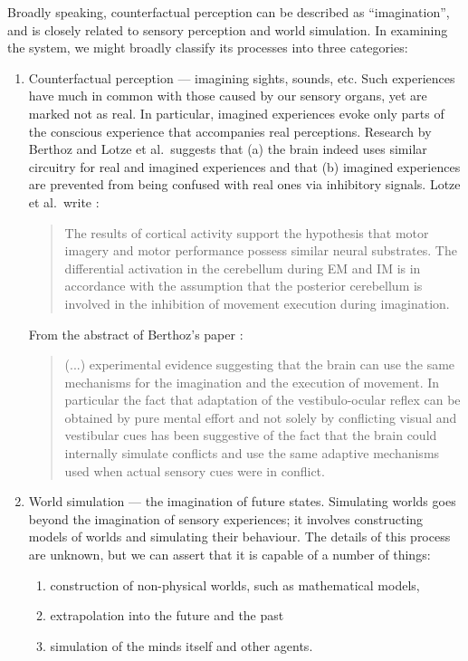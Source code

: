 Broadly speaking, counterfactual perception can be described as ``imagination'', and is closely related to sensory perception and world simulation. In examining the system, we might broadly classify its processes into three categories:

\begin{enumerate}
	\item Counterfactual perception --- imagining sights, sounds, etc. Such experiences have much in common with those caused by our sensory organs, yet are marked not as real. In particular, imagined experiences evoke only parts of the conscious experience that accompanies real perceptions. Research by Berthoz and Lotze et al.\ suggests that (a) the brain indeed uses similar circuitry for real and imagined experiences and that (b) imagined experiences are prevented from being confused with real ones via inhibitory signals. Lotze et al.\ write \cite{lotze1999}:
	\begin{quote}
		The results of cortical activity support the hypothesis that motor imagery and motor performance possess similar neural substrates. The differential activation in the cerebellum during EM and IM is in accordance with the assumption that the posterior cerebellum is involved in the inhibition of movement execution during imagination.
	\end{quote}
	
	From the abstract of Berthoz's paper \cite{8713551}:
	
	\begin{quotation}
		(...) experimental evidence suggesting that the brain can use the same mechanisms for the imagination and the execution of movement. In particular the fact that adaptation of the vestibulo-ocular reflex can be obtained by pure mental effort and not solely by conflicting visual and vestibular cues has been suggestive of the fact that the brain could internally simulate conflicts and use the same adaptive mechanisms used when actual sensory cues were in conflict.
	\end{quotation}
	
	\item World simulation --- the imagination of future states. Simulating worlds goes beyond the imagination of sensory experiences; it involves constructing models of worlds and simulating their behaviour. The details of this process are unknown, but we can assert that it is capable of a number of things:
	\begin{enumerate}
		\item construction of non-physical worlds, such as mathematical models,
		\item extrapolation into the future and the past
		\item simulation of the minds itself and other agents.
	\end{enumerate}
	

\end{enumerate}
